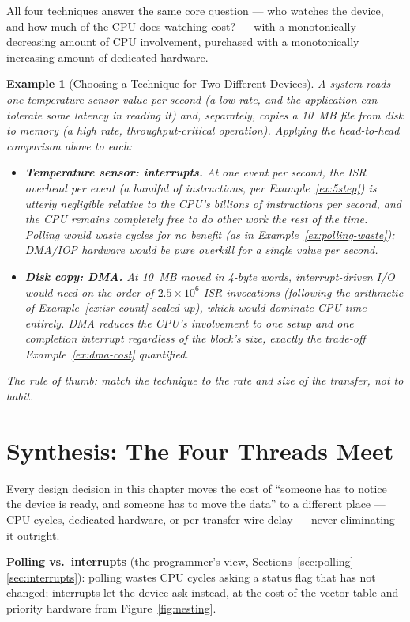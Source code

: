 \documentclass[11pt]{article}
\newtheorem{example}{Example}[section]
\begin{document}
All four techniques answer the same core question --- who watches the device, and how much of the CPU does watching cost? --- with a monotonically decreasing amount of CPU involvement, purchased with a monotonically increasing amount of dedicated hardware.

\begin{example}[Choosing a Technique for Two Different Devices]
\label{ex:choosing}
A system reads one temperature-sensor value per second (a low rate, and the application can tolerate some latency in reading it) and, separately, copies a 10~MB file from disk to memory (a high rate, throughput-critical operation). Applying the head-to-head comparison above to each:
\begin{itemize}
  \item \textbf{Temperature sensor: interrupts.} At one event per second, the ISR overhead per event (a handful of instructions, per Example~\ref{ex:5step}) is utterly negligible relative to the CPU's billions of instructions per second, and the CPU remains completely free to do other work the rest of the time. Polling would waste cycles for no benefit (as in Example~\ref{ex:polling-waste}); DMA/IOP hardware would be pure overkill for a single value per second.
  \item \textbf{Disk copy: DMA.} At 10~MB moved in 4-byte words, interrupt-driven I/O would need on the order of $2.5\times10^6$ ISR invocations (following the arithmetic of Example~\ref{ex:isr-count} scaled up), which would dominate CPU time entirely. DMA reduces the CPU's involvement to one setup and one completion interrupt regardless of the block's size, exactly the trade-off Example~\ref{ex:dma-cost} quantified.
\end{itemize}
The rule of thumb: match the technique to the \emph{rate} and \emph{size} of the transfer, not to habit.
\end{example}

\section{Synthesis: The Four Threads Meet}
\label{sec:synthesis}

Every design decision in this chapter moves the cost of ``someone has to notice the device is ready, and someone has to move the data'' to a different place --- CPU cycles, dedicated hardware, or per-transfer wire delay --- never eliminating it outright.

\textbf{Polling vs.\ interrupts} (the programmer's view, Sections~\ref{sec:polling}--\ref{sec:interrupts}): polling wastes CPU cycles asking a status flag that has not changed; interrupts let the device ask instead, at the cost of the vector-table and priority hardware from Figure~\ref{fig:nesting}.
\end{document}
